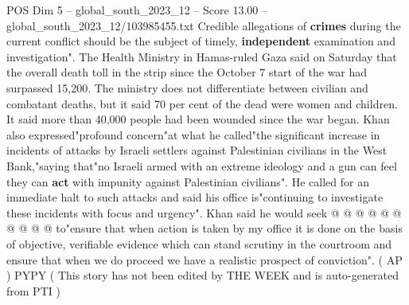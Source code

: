 \begin{textsample}{POS Dim 5 – global\_south\_2023\_12 – Score 13.00 – global\_south\_2023\_12/103985455.txt}
Credible allegations of \textbf{crimes} during the current conflict should be the subject of timely, \textbf{independent} examination and investigation".
The Health Ministry in Hamas-ruled Gaza said on Saturday that the overall death toll in the strip since the October 7 start of the war had surpassed 15,200.
The ministry does not differentiate between civilian and combatant deaths, but it said 70 per cent of the dead were women and children.
It said more than 40,000 people had been wounded since the war began.
Khan also expressed"profound concern"at what he called"the significant increase in incidents of attacks by Israeli settlers against Palestinian civilians in the West Bank,"saying that"no Israeli armed with an extreme ideology and a gun can feel they can \textbf{act} with impunity against Palestinian civilians".
He called for an immediate halt to such attacks and said his office is"continuing to investigate these incidents with focus and urgency".
Khan said he would seek @ @ @ @ @ @ @ @ @ @ to"ensure that when action is taken by my office it is done on the basis of objective, verifiable evidence which can stand scrutiny in the courtroom and ensure that when we do proceed we have a realistic prospect of conviction". ( AP ) PYPY ( This story has not been edited by THE WEEK and is auto-generated from PTI )

\end{textsample}
